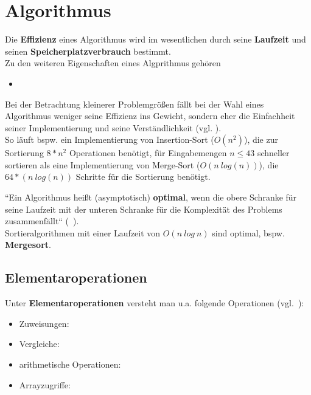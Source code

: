 \section{Algorithmus}

Die \textbf{Effizienz} eines Algorithmus wird im wesentlichen durch seine \textbf{Laufzeit} und seinen \textbf{Speicherplatzverbrauch} bestimmt.\\

\noindent
Zu den weiteren Eigenschaften eines Algprithmus gehören

\begin{itemize}
    \item
\end{itemize}

\noindent
Bei der Betrachtung kleinerer Problemgrößen fällt bei der Wahl eines Algorithmus weniger seine Effizienz ins Gewicht, sondern eher die Einfachheit seiner Implementierung und seine Verständlichkeit (vgl. \cite[5 f.]{GD18a}).\\
So läuft bspw. ein Implementierung von Insertion-Sort ($O(n^2)$), die zur Sortierung $8*n^2$ Operationen benötigt, für Eingabemengen $n \leq 43$ schneller sortieren als eine Implementierung von Merge-Sort ($O(n\ log(n))$), die $64 * (n\ log(n))$ Schritte für die Sortierung benötigt.\\

\begin{tcolorbox}[title={Optimaler Algorithmus}]
    ``Ein Algorithmus heißt (asymptotisch) \textbf{optimal}, wenn die obere Schranke für seine Laufzeit mit der unteren Schranke für die Komplexität des Problems zusammenfällt`` (~\cite[20]{GD18a}).\\

    \noindent
    Sortieralgorithmen mit einer Laufzeit von $O(n\ log\ n)$ sind optimal, bspw. \textbf{Mergesort}.
\end{tcolorbox}



\subsection{Elementaroperationen}

Unter \textbf{Elementaroperationen} versteht man u.a. folgende Operationen (vgl.~\cite[6]{GD18a}):

\begin{itemize}
    \item Zuweisungen: 
    \item Vergleiche: 
    \item arithmetische Operationen: 
    \item Arrayzugriffe: 
\end{itemize}

